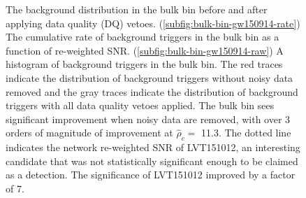 \begin{figure}[!ht]%
\centering
  \caption[Bulk bin histograms - GW150914 analysis]{The background distribution in the bulk bin before and after applying data quality (DQ) vetoes. %
           (\ref{subfig:bulk-bin-gw150914-rate}) The cumulative rate of background triggers %
           in the bulk bin as a function of re-weighted SNR. %
           (\ref{subfig:bulk-bin-gw150914-raw}) A histogram of background triggers %
           in the bulk bin. %
           The red traces indicate the %
           distribution of background triggers without noisy data removed and the gray traces %
           indicate the distribution  %
           of background triggers with all data quality vetoes applied. The bulk bin sees %
           significant improvement when noisy data are removed, with over 3 orders %
           of magnitude of improvement at $\hat{\rho}_{c} =$ 11.3. The dotted line indicates the %
           network re-weighted SNR of LVT151012, an interesting candidate that was not %
           statistically significant enough to be claimed as a detection. The significance of %
           LVT151012 improved by a factor of 7.}
  \label{fig:bulk-bin-far_GW150914}
\end{figure}

